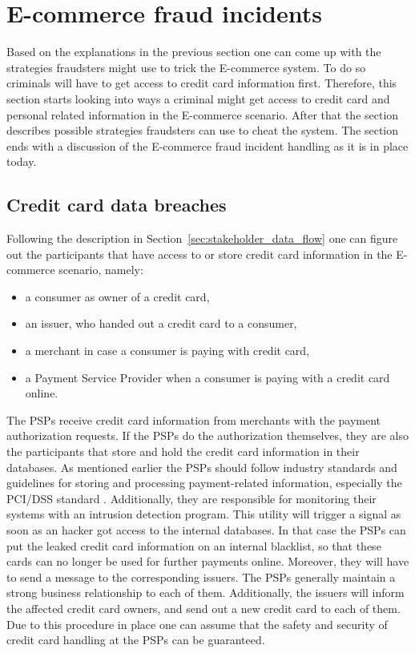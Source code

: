 
\section{\Gls{E-commerce} fraud incidents}
\label{sec:scenario_fraud}

Based on the explanations in the previous section one can come up with the strategies fraudsters might use to trick the \gls{E-commerce} system. To do so criminals will have to get access to credit card information first. Therefore, this section starts looking into ways a criminal might get access to credit card and personal related information in the \gls{E-commerce} scenario. After that the section describes possible strategies fraudsters can use to cheat the system. The section ends with a discussion of the \gls{E-commerce} fraud incident handling as it is in place today.

\subsection{Credit card data breaches}
\label{subsec:leaking_credit_cards}

Following the description in Section~\ref{sec:stakeholder_data_flow} one can figure out the participants that have access to or store credit card information in the \gls{E-commerce} scenario, namely:\@

\begin{itemize}
  \item a consumer as owner of a credit card,
  \item an issuer, who handed out a credit card to a consumer,
  \item a merchant in case a consumer is paying with credit card,
  \item a Payment Service Provider when a consumer is paying with a credit card online.
\end{itemize}

The \gls{PSP}s receive credit card information from merchants with the payment authorization requests. If the \gls{PSP}s do the authorization themselves, they are also the participants that store and hold the credit card information in their databases. As mentioned earlier the \gls{PSP}s should follow industry standards and guidelines for storing and processing payment-related information, especially the \gls{PCI/DSS} standard \citep{virtue2009payment}. Additionally, they are responsible for monitoring their systems with an intrusion detection program. This utility will trigger a signal as soon as an hacker got access to the internal databases. In that case the \gls{PSP}s can put the leaked credit card information on an internal blacklist, so that these cards can no longer be used for further payments online. Moreover, they will have to send a message to the corresponding issuers. The \gls{PSP}s generally maintain a strong business relationship to each of them. Additionally, the issuers will inform the affected credit card owners, and send out a new credit card to each of them. Due to this procedure in place one can assume that the safety and security of credit card handling at the \gls{PSP}s can be guaranteed. \\

